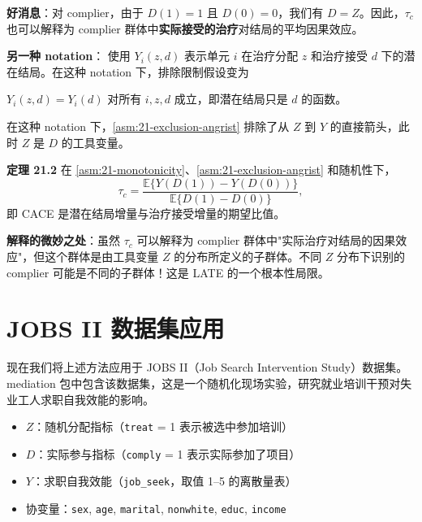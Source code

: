 \textbf{好消息}：对 complier，由于 $D(1) = 1$ 且 $D(0) = 0$，我们有 $D = Z$。因此，$\tau_c$ 也可以解释为 complier 群体中\textbf{实际接受的治疗}对结局的平均因果效应。

\textbf{另一种 notation}：\citet{AngristImbensRubin:1996} 使用 $Y_i(z, d)$ 表示单元 $i$ 在治疗分配 $z$ 和治疗接受 $d$ 下的潜在结局。在这种 notation 下，排除限制假设变为

\begin{Assumption}\label{asm:21-exclusion-angrist}
$Y_i(z, d) = Y_i(d)$ 对所有 $i, z, d$ 成立，即潜在结局只是 $d$ 的函数。
\end{Assumption}

在这种 notation 下，\cref{asm:21-exclusion-angrist} 排除了从 $Z$ 到 $Y$ 的直接箭头，此时 $Z$ 是 $D$ 的工具变量。

\textbf{定理 21.2}\label{th:21-cace-theorem-2}
在 \cref{asm:21-monotonicity}、\cref{asm:21-exclusion-angrist} 和随机性下，
\[
\tau_c = \frac{\mathbb{E}\{Y(D(1)) - Y(D(0))\}}{\mathbb{E}\{D(1) - D(0)\}},
\]
即 CACE 是潜在结局增量与治疗接受增量的期望比值。

\textbf{解释的微妙之处}：虽然 $\tau_c$ 可以解释为 complier 群体中"实际治疗对结局的因果效应"，但这个群体是由工具变量 $Z$ 的分布所定义的子群体。不同 $Z$ 分布下识别的 complier 可能是不同的子群体！这是 LATE 的一个根本性局限。


\section{JOBS II 数据集应用}\label{sec:21-application}

现在我们将上述方法应用于 JOBS II（Job Search Intervention Study）数据集。mediation 包中包含该数据集，这是一个随机化现场实验，研究就业培训干预对失业工人求职自我效能的影响。

\begin{itemize}
  \item $Z$：随机分配指标（\texttt{treat} = 1 表示被选中参加培训）
  \item $D$：实际参与指标（\texttt{comply} = 1 表示实际参加了项目）
  \item $Y$：求职自我效能（\texttt{job\_seek}，取值 1--5 的离散量表）
  \item 协变量：\texttt{sex}, \texttt{age}, \texttt{marital}, \texttt{nonwhite}, \texttt{educ}, \texttt{income}
\end{itemize}

